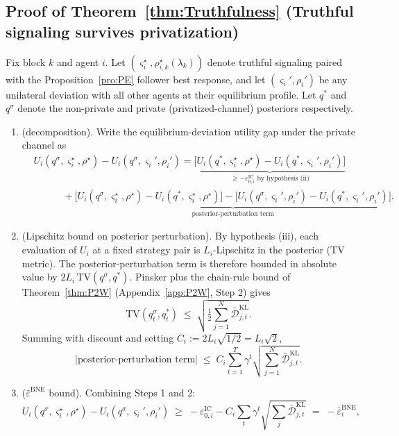 \documentclass{article}
\begin{document}
\subsection{Proof of Theorem~\ref{thm:Truthfulness} (Truthful signaling survives privatization)}\label{app:Truthfulness}

Fix block $k$ and agent $i$. Let $(\varsigma_i^\star, \rho_{i,k}^\star(\lambda_k))$ denote truthful signaling paired with the Proposition~\ref{pro:PE} follower best response, and let $(\varsigma_i', \rho_i')$ be any unilateral deviation with all other agents at their equilibrium profile. Let $q^*$ and $q^\sigma$ denote the non-private and private (privatized-channel) posteriors respectively.
\begin{enumerate}
    \item[Step 1] (decomposition). Write the equilibrium-deviation utility gap under the private channel as
\begin{align*}
&U_i(q^\sigma,\varsigma_i^\star,\rho^\star) - U_i(q^\sigma,\varsigma_i',\rho_i') = \underbrace{\big[U_i(q^*,\varsigma_i^\star,\rho^\star) - U_i(q^*,\varsigma_i',\rho_i')\big]}_{\ge -\varepsilon_{0,i}^{\mathrm{IC}} \text{ by hypothesis (ii)}} \\
&\qquad\quad + \underbrace{\big[U_i(q^\sigma,\varsigma_i^\star,\rho^\star) - U_i(q^*,\varsigma_i^\star,\rho^\star)\big] - \big[U_i(q^\sigma,\varsigma_i',\rho_i') - U_i(q^*,\varsigma_i',\rho_i')\big]}_{\text{posterior-perturbation term}}.
\end{align*}
    \item[Step 2] (Lipschitz bound on posterior perturbation). By hypothesis (iii), each evaluation of $U_i$ at a fixed strategy pair is $L_i$-Lipschitz in the posterior (TV metric). The posterior-perturbation term is therefore bounded in absolute value by $2L_i \,\mathrm{TV}(q^\sigma, q^*)$. Pinsker plus the chain-rule bound of Theorem~\ref{thm:P2W} (Appendix~\ref{app:P2W}, Step 2) gives
$$\mathrm{TV}(q^\sigma_t, q^*_t) \;\le\; \sqrt{\tfrac{1}{2} \sum_{j=1}^N \bar{\mathcal{D}}_{j,t}^{\mathrm{KL}}}.$$
Summing with discount and setting $C_i := 2 L_i \sqrt{1/2} = L_i\sqrt 2$,
$$\big|\text{posterior-perturbation term}\big| \;\le\; C_i \sum_{t=1}^T \gamma^t \sqrt{\textstyle\sum_{j=1}^N \bar{\mathcal{D}}_{j,t}^{\mathrm{KL}}}.$$
    \item[Step 3] ($\bar\varepsilon^{\mathrm{BNE}}$ bound). Combining Steps 1 and 2:
$$U_i(q^\sigma,\varsigma_i^\star,\rho^\star) - U_i(q^\sigma,\varsigma_i',\rho_i') \;\ge\; -\varepsilon_{0,i}^{\mathrm{IC}} - C_i \sum_t \gamma^t \sqrt{\textstyle\sum_j \bar{\mathcal{D}}_{j,t}^{\mathrm{KL}}} \;=\; -\bar\varepsilon_i^{\mathrm{BNE}},$$

\end{enumerate}
\end{document}
